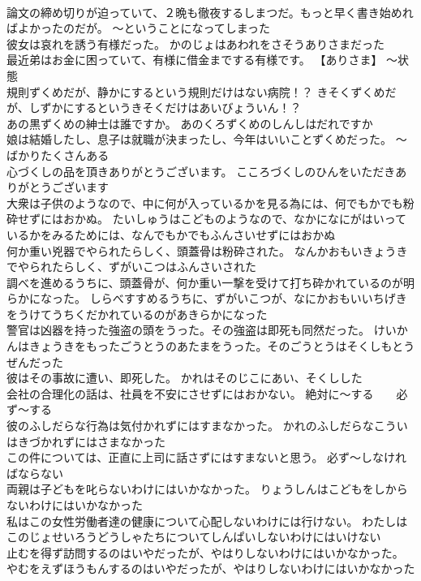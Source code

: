 \documentclass[8pt]{extreport}
\begin{document}
\begin{CJK}{UTF8}{min}
\\	論文の締め切りが迫っていて、２晩も徹夜するしまつだ。もっと早く書き始めればよかったのだが。	～ということになってしまった
\\	彼女は哀れを誘う有様だった。	かのじょはあわれをさそうありさまだった 
\\	最近弟はお金に困っていて、有様に借金までする有様です。	【ありさま】 ～状態
\\	規則ずくめだが、静かにするという規則だけはない病院！？	きそくずくめだが、しずかにするというきそくだけはあいびょういん！？ 
\\	あの黒ずくめの紳士は誰ですか。	あのくろずくめのしんしはだれですか 
\\	娘は結婚したし、息子は就職が決まったし、今年はいいことずくめだった。	～ばかりたくさんある
\\	心づくしの品を頂きありがとうございます。	こころづくしのひんをいただきありがとうございます 
\\	大衆は子供のようなので、中に何が入っているかを見る為には、何でもかでも粉砕せずにはおかぬ。	たいしゅうはこどものようなので、なかになにがはいっているかをみるためには、なんでもかでもふんさいせずにはおかぬ 
\\	何か重い兇器でやられたらしく、頭蓋骨は粉砕された。	なんかおもいきょうきでやられたらしく、ずがいこつはふんさいされた 
\\	調べを進めるうちに、頭蓋骨が、何か重い一撃を受けて打ち砕かれているのが明らかになった。	しらべすすめるうちに、ずがいこつが、なにかおもいいちげきをうけてうちくだかれているのがあきらかになった 
\\	警官は凶器を持った強盗の頭をうった。その強盗は即死も同然だった。	けいかんはきょうきをもったごうとうのあたまをうった。そのごうとうはそくしもとうぜんだった 
\\	彼はその事故に遭い、即死した。	かれはそのじこにあい、そくしした 
\\	会社の合理化の話は、社員を不安にさせずにはおかない。	絶対に～する　　必ず～する
\\	彼のふしだらな行為は気付かれずにはすまなかった。	かれのふしだらなこういはきづかれずにはさまなかった 
\\	この件については、正直に上司に話さずにはすまないと思う。	必ず～しなければならない
\\	両親は子どもを叱らないわけにはいかなかった。	りょうしんはこどもをしからないわけにはいかなかった 
\\	私はこの女性労働者達の健康について心配しないわけには行けない。	わたしはこのじょせいろうどうしゃたちについてしんぱいしないわけにはいけない 
\\	止むを得ず訪問するのはいやだったが、やはりしないわけにはいかなかった。	やむをえずほうもんするのはいやだったが、やはりしないわけにはいかなかった 

\end{CJK}
\end{document}
